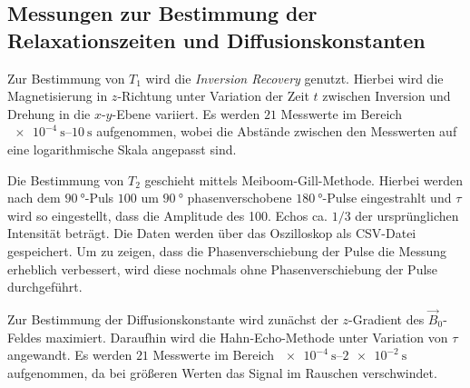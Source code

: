 \subsection{Messungen zur Bestimmung der Relaxationszeiten und Diffusionskonstanten}

Zur Bestimmung von $T_1$ wird die \textit{Inversion Recovery} genutzt. Hierbei wird die Magnetisierung in $z$-Richtung unter Variation der Zeit $t$ zwischen Inversion und Drehung in die $x$-$y$-Ebene variiert. Es werden $21$ Messwerte im Bereich $\SIrange{e-4}{10}{\second}$ aufgenommen, wobei die Abstände zwischen den Messwerten auf eine logarithmische Skala angepasst sind.

Die Bestimmung von $T_2$ geschieht mittels Meiboom-Gill-Methode. Hierbei werden nach dem $\SI{90}{\degree}$-Puls $100$ um $\SI{90}{\degree}$ phasenverschobene $\SI{180}{\degree}$-Pulse eingestrahlt und $\tau$ wird so eingestellt, dass die Amplitude des 100. Echos ca. $1/3$ der ursprünglichen Intensität beträgt. Die Daten werden über das Oszilloskop als CSV-Datei gespeichert. Um zu zeigen, dass die Phasenverschiebung der Pulse die Messung erheblich verbessert, wird diese nochmals ohne Phasenverschiebung der Pulse durchgeführt.

Zur Bestimmung der Diffusionskonstante wird zunächst der $z$-Gradient des $\vec{B}_0$-Feldes maximiert. Daraufhin wird die Hahn-Echo-Methode unter Variation von $\tau$ angewandt. Es werden $21$ Messwerte im Bereich $\SIrange{e-4}{2e-2}{\second}$ aufgenommen, da bei größeren Werten das Signal im Rauschen verschwindet.
